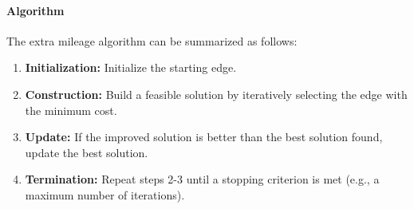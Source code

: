 \documentclass{article}
\begin{document}
\paragraph{Algorithm}
The extra mileage algorithm can be summarized as follows:
\begin{enumerate}
	\item \textbf{Initialization:} Initialize the starting edge.
	\item \textbf{Construction:} Build a feasible solution by iteratively selecting the edge with the minimum cost.
	\item \textbf{Update:} If the improved solution is better than the best solution found, update the best solution.
	\item \textbf{Termination:} Repeat steps 2-3 until a stopping criterion is met (e.g., a maximum number of iterations).
\end{enumerate}
\end{document}
